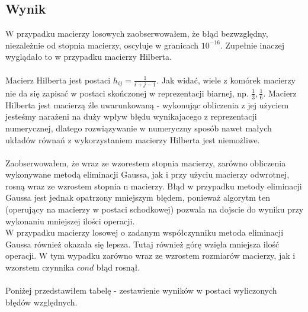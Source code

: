 \subsection{Wynik}
W przypadku macierzy losowych zaobserwowałem, że błąd bezwzględny, niezależnie od stopnia macierzy, oscyluje w granicach $ 10^{-16} $. Zupełnie inaczej wyglądało to w przypadku macierzy Hilberta. \\\\
Macierz Hilberta jest postaci $ h_{ij} = \frac{1}{i + j - 1}$. Jak widać, wiele z komórek macierzy nie da się zapisać w postaci skończonej w reprezentacji biarnej, np. $ \frac{1}{3}, \frac{1}{6} $. Macierz Hilberta jest macierzą źle uwarunkowaną - wykonując obliczenia z jej użyciem jesteśmy narażeni na duży wpływ błędu wynikajacego z reprezentacji numerycznej, dlatego rozwiązywanie w numeryczny sposób nawet małych układów równań z wykorzystaniem macierzy Hilberta jest niemożliwe. \\\\
Zaobserwowałem, że wraz ze wzorestem stopnia macierzy, zarówno obliczenia wykonywane metodą eliminacji Gaussa, jak i przy użyciu macierzy odwrotnej, rosną wraz ze wzrostem stopnia n macierzy. Błąd w przypadku metody eliminacji Gaussa jest jednak opatrzony mniejszym błędem, ponieważ algorytm ten (operujący na macierzy w postaci schodkowej) pozwala na dojscie do wyniku przy wykonaniu mniejszej ilości operacji. \\
W przypadku macierzy losowej o zadanym współczynniku metoda eliminacji Gaussa również okazała się lepsza. Tutaj również górę wzięła mniejsza ilość operacji. W tym wypadku zarówno wraz ze wzrostem rozmiarów macierzy, jak i wzorstem czynnika $ cond $ błąd rosnął. \\\\
Poniżej przedstawiłem tabelę - zestawienie wyników w postaci wyliczonych błędów względnych. \\
\begin{center}

\end{center}

